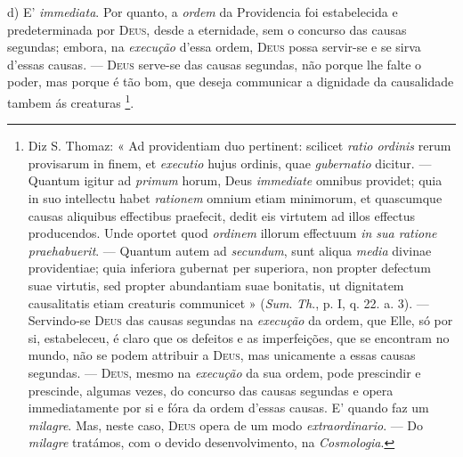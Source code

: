  d) E' \emph{immediata}. Por quanto, a \emph{ordem} da Providencia foi estabelecida e predeterminada por \textsc{Deus}, desde a eternidade, sem o concurso das causas segundas; embora, na \emph{execução} d'essa ordem, \textsc{Deus} possa servir-se e se sirva d'essas causas. --- \textsc{Deus} serve-se das causas segundas, não porque lhe falte o poder, mas porque é tão bom, que deseja communicar a dignidade da causalidade tambem ás creaturas \footnote{Diz S. Thomaz: « Ad providentiam duo pertinent: scilicet \emph{ratio ordinis} rerum provisarum in finem, et \emph{executio} hujus ordinis, quae \emph{gubernatio} dicitur. --- Quantum igitur ad \emph{primum} horum, Deus \emph{immediate} omnibus providet; quia in suo intellectu habet \emph{rationem} omnium etiam minimorum, et quascumque causas aliquibus effectibus praefecit, dedit eis virtutem ad illos effectus producendos. Unde oportet quod \emph{ordinem} illorum effectuum \emph{in sua ratione praehabuerit}. --- Quantum autem ad \emph{secundum}, sunt aliqua \emph{media} divinae providentiae; quia inferiora gubernat per superiora, non propter defectum suae virtutis, sed propter abundantiam suae bonitatis, ut dignitatem causalitatis etiam creaturis communicet » (\emph{Sum}. \emph{Th}., p. I, q. 22. a. 3). --- Servindo-se \textsc{Deus} das causas segundas na \emph{execução} da ordem, que Elle, só por si, estabeleceu, é claro que os defeitos e as imperfeições, que se encontram no mundo, não se podem attribuir a \textsc{Deus}, mas unicamente a essas causas segundas. --- \textsc{Deus}, mesmo na \emph{execução} da sua ordem, pode prescindir e prescinde, algumas vezes, do concurso das causas segundas e opera immediatamente por si e fóra da ordem d'essas causas. E' quando faz um \emph{milagre}. Mas, neste caso, \textsc{Deus} opera de um modo \emph{extraordinario}. --- Do \emph{milagre} tratámos, com o devido desenvolvimento, na \emph{Cosmologia}.}.

